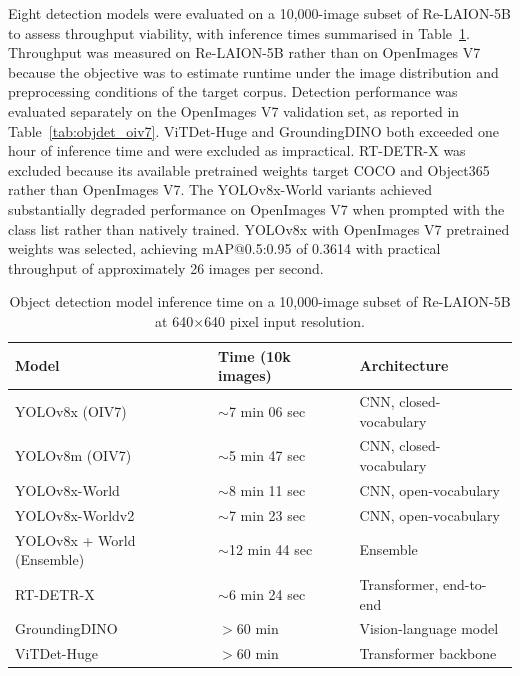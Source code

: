 Eight detection models were evaluated on a 10,000-image subset of Re-LAION-5B to assess throughput viability, with inference times summarised in Table~\ref{tab:objdet_speed}. Throughput was measured on Re-LAION-5B rather than on OpenImages V7 because the objective was to estimate runtime under the image distribution and preprocessing conditions of the target corpus. Detection performance was evaluated separately on the OpenImages V7 validation set, as reported in Table~\ref{tab:objdet_oiv7}. ViTDet-Huge \cite{Li_2022_ViTDet} and GroundingDINO \cite{Liu_2024_GroundingDINO} both exceeded one hour of inference time and were excluded as impractical. RT-DETR-X \cite{Zhao_2024_RTDETR} was excluded because its available pretrained weights target COCO and Object365 rather than OpenImages V7. The YOLOv8x-World variants achieved substantially degraded performance on OpenImages V7 when prompted with the class list rather than natively trained. YOLOv8x with OpenImages V7 pretrained weights was selected, achieving mAP@0.5:0.95 of 0.3614 with practical throughput of approximately 26 images per second.

\begin{table}[ht]
	\centering
	\footnotesize
	\begin{tabular}{lll}
		\hline
		\textbf{Model}             & \textbf{Time (10k images)} & \textbf{Architecture}   \\
		\hline
		YOLOv8x (OIV7)             & $\sim$7 min 06 sec         & CNN, closed-vocabulary  \\
		YOLOv8m (OIV7)             & $\sim$5 min 47 sec         & CNN, closed-vocabulary  \\
		YOLOv8x-World              & $\sim$8 min 11 sec         & CNN, open-vocabulary    \\
		YOLOv8x-Worldv2            & $\sim$7 min 23 sec         & CNN, open-vocabulary    \\
		YOLOv8x + World (Ensemble) & $\sim$12 min 44 sec        & Ensemble                \\
		RT-DETR-X                  & $\sim$6 min 24 sec         & Transformer, end-to-end \\
		GroundingDINO              & $>$60 min                  & Vision-language model   \\
		ViTDet-Huge                & $>$60 min                  & Transformer backbone    \\
		\hline
	\end{tabular}
	\caption{Object detection model inference time on a 10,000-image subset of Re-LAION-5B
		at 640$\times$640 pixel input resolution.}
	\label{tab:objdet_speed}
\end{table}

